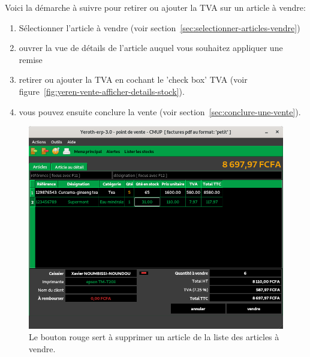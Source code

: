 
\label{sec:modifier-TVA-article}

Voici la d\'emarche \`a suivre pour retirer ou ajouter
la TVA sur un article \`a vendre:

\begin{enumerate}[1)]
	\item S\'electionner l'article \`a vendre (voir section~\ref{sec:selectionner-articles-vendre})
	\item ouvrer la vue de d\'etails de l'article auquel
	vous souhaitez appliquer une remise
	
	\item retirer ou ajouter la TVA en cochant le 'check box'
	TVA (voir figure~\ref{fig:yeren-vente-afficher-details-stock}).
	
	\item vous pouvez ensuite conclure la vente (voir section~\ref{sec:conclure-une-vente}).
\end{enumerate} 

\newpage
{}

\begin{figure}[!htbp]
	\centering
	\includegraphics[scale=0.63]{images/yeren-vendre-supprimer-article.png}
	\caption{Le bouton rouge sert \`a supprimer un article
		de la liste des articles \`a vendre.}
	\label{fig:yeren-vendre-supprimer-article}
\end{figure}

